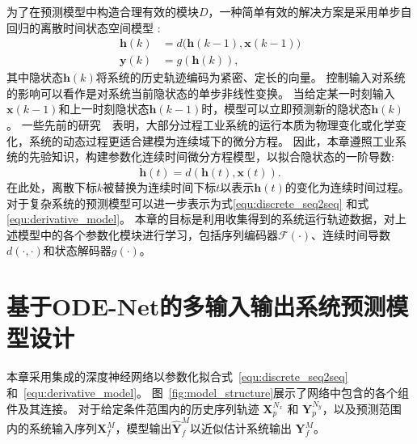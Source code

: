 为了在预测模型中构造合理有效的模块$D$，一种简单有效的解决方案是采用单步自回归的离散时间状态空间模型 \cite{4019326}:
\begin{equation}
    \begin{aligned}
\boldsymbol{h}(k)&=d\big(\boldsymbol{h}(k-1), \boldsymbol{x}(k-1)\big)\\
\boldsymbol{y}(k)&=g(\boldsymbol{h}(k)),
    \end{aligned}
\end{equation}
其中隐状态$\boldsymbol{h}(k)$将系统的历史轨迹编码为紧密、定长的向量。
控制输入对系统的影响可以看作是对系统当前隐状态的单步非线性变换。
当给定某一时刻输入$\boldsymbol{x}(k-1)$和上一时刻隐状态$\boldsymbol{h}(k-1)$时，模型可以立即预测新的隐状态$\boldsymbol{h}(k)$。
一些先前的研究~\cite{CHAI201661}~\cite{KIM2004403}表明，大部分过程工业系统的运行本质为物理变化或化学变化，系统的动态过程更适合建模为连续域下的微分方程。
因此，本章遵照工业系统的先验知识，构建参数化连续时间微分方程模型，以拟合隐状态的一阶导数:
\begin{equation}
    \label{equ:derivative_model}
    \dot{\boldsymbol h}(t) = d(\boldsymbol{h}(t), \boldsymbol x(t)).
\end{equation}
在此处，离散下标$k$被替换为连续时间下标$t$以表示$\boldsymbol{h}(t)$的变化为连续时间过程。
对于复杂系统的预测模型可以进一步表示为式\eqref{equ:discrete_seq2seq} 和式 \eqref{equ:derivative_model}。
本章的目标是利用收集得到的系统运行轨迹数据，对上述模型中的各个参数化模块进行学习，包括序列编码器$\mathcal{F}(\cdot)$、连续时间导数$d(\cdot,\cdot)$和状态解码器$g(\cdot)$。
\section{基于ODE-Net的多输入输出系统预测模型设计}
\label{sec:model}
本章采用集成的深度神经网络以参数化拟合式~\eqref{equ:discrete_seq2seq}和~\eqref{equ:derivative_model}。
图~\ref{fig:model_structure}展示了网络中包含的各个组件及其连接。
对于给定条件范围内的历史序列轨迹 $\boldsymbol{X}_{p}^{N_{x}}$ 和 $\boldsymbol{Y}_{p}^{N_{y}}$，以及预测范围 内的系统输入序列$\boldsymbol{X}_{f}^{M}$，模型输出$\hat{\boldsymbol{Y}}_{f}^{M}$以近似估计系统输出 $\boldsymbol{Y}_{f}^{M}$。

